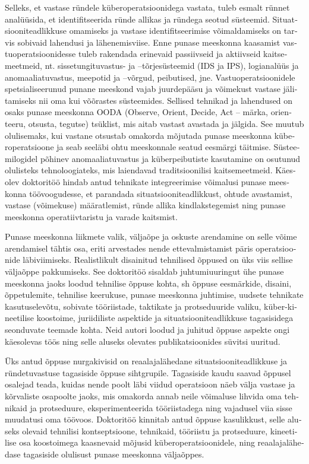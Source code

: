 \begin{otherlanguage}{estonian}
Selleks, et vastase ründele küberoperatsioonidega vastata, tuleb esmalt rünnet analüüsida, et identifitseerida ründe allikas ja ründega seotud süsteemid. Situatsiooniteadlikkuse omamiseks ja vastase identifitseerimise võimaldamiseks on tarvis sobivaid lahendusi ja lähenemisviise. Enne punase meeskonna kaasamist vastuoperatsioonidesse tuleb rakendada erinevaid passiivseid ja aktiivseid kaitsemeetmeid, nt. sissetungituvastus- ja –tõrjesüsteemid (IDS ja IPS), logianalüüs ja anomaaliatuvastus, meepotid ja –võrgud, peibutised, jne. Vastuoperatsioonidele spetsialiseerunud punane meeskond vajab juurdepääsu ja võimekust vastase jälitamiseks nii oma kui võõrastes süsteemides. Sellised tehnikad ja lahendused on osaks punase meeskonna OODA (Observe, Orient, Decide, Act – märka, orienteeru, otsusta, tegutse) tsüklist, mis aitab vastast avastada ja jälgida. See muutub olulisemaks, kui vastane otsustab omakorda mõjutada punase meeskonna küberoperatsioone ja seab seeläbi ohtu meeskonnale seatud eesmärgi täitmise. Süsteemilogidel põhinev anomaaliatuvastus ja küberpeibutiste kasutamine on osutunud olulisteks tehnoloogiateks, mis laiendavad traditsioonilisi kaitsemeetmeid. Käesolev doktoritöö hindab antud tehnikate integreerimise võimalusi punase meeskonna töövoogudesse, et parandada situatsiooniteadlikkust, ohtude avastamist, vastase (võimekuse) määratlemist, ründe allika kindlakstegemist ning punase meeskonna operatiivtaristu ja varade kaitsmist.

Punase meeskonna liikmete valik, väljaõpe ja oskuste arendamine on selle võime arendamisel tähtis osa, eriti arvestades nende ettevalmistamist päris operatsioonide läbiviimiseks. Realistlikult disainitud tehnilised õppused on üks viis sellise väljaõppe pakkumiseks. See doktoritöö sisaldab juhtumiuuringut ühe punase meeskonna jaoks loodud tehnilise õppuse kohta, sh õppuse eesmärkide, disaini, õppetulemite, tehnilise keerukuse, punase meeskonna juhtimise, uudsete tehnikate kasutuselevõtu, sobivate tööriistade, taktikate ja protseduuride valiku, küber-kineetilise koostoime, juriidiliste aspektide ja situatsiooniteadlikkuse tagasisidega seonduvate teemade kohta. Neid autori loodud ja juhitud õppuse aspekte ongi käesolevas töös ning selle aluseks olevates publikatsioonides süvitsi uuritud.

Üks antud õppuse nurgakivisid on reaalajalähedane situatsiooniteadlikkuse ja ründetuvastuse tagasiside õppuse sihtgrupile. Tagasiside kaudu saavad õppusel osalejad teada, kuidas nende poolt läbi viidud operatsioon näeb välja vastase ja kõrvaliste osapoolte jaoks, mis omakorda annab neile võimaluse lihvida oma tehnikaid ja protseduure, eksperimenteerida tööriistadega ning vajadusel viia sisse muudatusi oma töövoos. Doktoritöö kinnitab antud õppuse kasulikkust, selle aluseks olevaid tehnilisi kontseptsioone, tehnikaid, tööriistu ja protseduure, kineetilise osa koostoimega kaasnevaid mõjusid küberoperatsioonidele, ning reaalajalähedase tagasiside olulisust punase meeskonna väljaõppes.


\end{otherlanguage}
